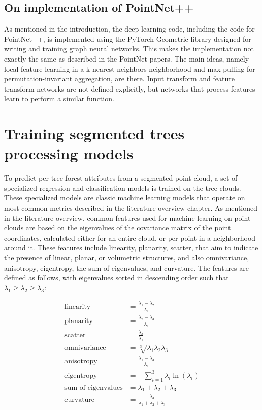 \subsection{On implementation of PointNet++}

As mentioned in the introduction, the deep learning code, including the code for PointNet++, is implemented using the PyTorch Geometric library designed for writing and training graph neural networks.
This makes the implementation not exactly the same as described in the PointNet papers.
The main ideas, namely local feature learning in a k-nearest neighbors neighborhood and max pulling for permutation-invariant aggregation, are there.
Input transform and feature transform networks are not defined explicitly, but networks that process features learn to perform a similar function.

\section{Training segmented trees processing models}\label{sec-training-tree-processors}

To predict per-tree forest attributes from a segmented point cloud, a set of specialized regression and classification models is trained on the tree clouds.
These specialized models are classic machine learning models that operate on most common metrics described in the literature overview chapter.
As mentioned in the literature overview, common features used for machine learning on point clouds are based on the eigenvalues of the covariance matrix of the point coordinates, calculated either for an entire cloud, or per-point in a neighborhood around it.
These features include linearity, planarity, scatter, that aim to indicate the presence of linear, planar, or volumetric structures, and also omnivariance, anisotropy, eigentropy, the sum of eigenvalues, and curvature.
The features are defined as follows, with eigenvalues sorted in descending order such that $\lambda_1 \ge \lambda_2 \ge \lambda_3$:

$$
\begin{aligned}
\text{linearity} &= \frac{\lambda_1 - \lambda_2}{\lambda_1} \\
\text{planarity} &= \frac{\lambda_2 - \lambda_3}{\lambda_1} \\
\text{scatter} &= \frac{\lambda_3}{\lambda_1}  \\
\text{omnivariance} &= \sqrt[3]{\lambda_1\lambda_2\lambda_3} \\
\text{anisotropy} &= \frac{\lambda_1 - \lambda_3}{\lambda_1} \\
\text{eigentropy} &= -\sum_{i=1}^{3} \lambda_i \ln(\lambda_i) \\
\text{sum of eigenvalues} &= \lambda_1 + \lambda_2 + \lambda_3 \\
\text{curvature} &= \frac{\lambda_3}{\lambda_1 + \lambda_2 + \lambda_3} \\
\end{aligned}
$$

